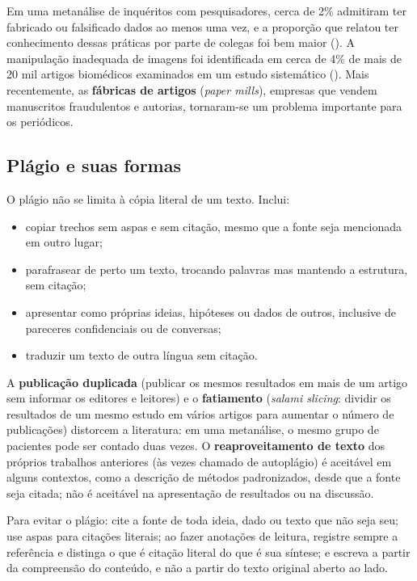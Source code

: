 \documentclass[
]{book}
\providecommand{\tightlist}{%
  \setlength{\itemsep}{0pt}\setlength{\parskip}{0pt}}
\begin{document}
Em uma metanálise de inquéritos com pesquisadores, cerca de 2\% admitiram ter fabricado ou falsificado dados ao menos uma vez, e a proporção que relatou ter conhecimento dessas práticas por parte de colegas foi bem maior (). A manipulação inadequada de imagens foi identificada em cerca de 4\% de mais de 20 mil artigos biomédicos examinados em um estudo sistemático (). Mais recentemente, as \textbf{fábricas de artigos} (\emph{paper mills}), empresas que vendem manuscritos fraudulentos e autorias, tornaram-se um problema importante para os periódicos.

\subsection{Plágio e suas formas}\label{pluxe1gio-e-suas-formas}

O plágio não se limita à cópia literal de um texto. Inclui:

\begin{itemize}
\tightlist
\item
  copiar trechos sem aspas e sem citação, mesmo que a fonte seja mencionada em outro lugar;
\item
  parafrasear de perto um texto, trocando palavras mas mantendo a estrutura, sem citação;
\item
  apresentar como próprias ideias, hipóteses ou dados de outros, inclusive de pareceres confidenciais ou de conversas;
\item
  traduzir um texto de outra língua sem citação.
\end{itemize}

A \textbf{publicação duplicada} (publicar os mesmos resultados em mais de um artigo sem informar os editores e leitores) e o \textbf{fatiamento} (\emph{salami slicing}: dividir os resultados de um mesmo estudo em vários artigos para aumentar o número de publicações) distorcem a literatura: em uma metanálise, o mesmo grupo de pacientes pode ser contado duas vezes. O \textbf{reaproveitamento de texto} dos próprios trabalhos anteriores (às vezes chamado de autoplágio) é aceitável em alguns contextos, como a descrição de métodos padronizados, desde que a fonte seja citada; não é aceitável na apresentação de resultados ou na discussão.

Para evitar o plágio: cite a fonte de toda ideia, dado ou texto que não seja seu; use aspas para citações literais; ao fazer anotações de leitura, registre sempre a referência e distinga o que é citação literal do que é sua síntese; e escreva a partir da compreensão do conteúdo, e não a partir do texto original aberto ao lado.
\end{document}
